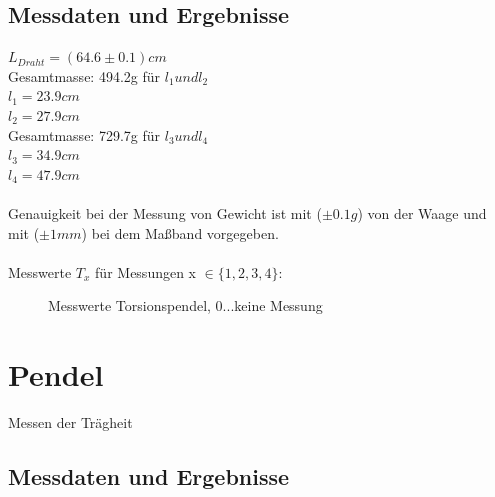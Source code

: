 \documentclass[12pt,a4paper]{article}
\begin{document}
\begin{multicols}{2}
\subsection{Messdaten und Ergebnisse}
$L_{Draht} = (64.6 \pm 0.1)cm$\\
Gesamtmasse: 494.2g für $l_1 und l_2$\\
$l_1 = 23.9cm$\\
$l_2 = 27.9cm$\\
Gesamtmasse: 729.7g für $l_3 und l_4$\\
$l_3 = 34.9cm$\\
$l_4 = 47.9cm$\\
\\
Genauigkeit bei der Messung von Gewicht ist mit ($\pm 0.1g$) von der Waage und mit ($\pm 1mm$) bei dem Maßband vorgegeben.\\
\\
Messwerte $T_x$ für Messungen x $\in\{1,2,3,4\}$:\\

\begin{figure}[H]
	\centering
	\caption{Messwerte Torsionspendel, 0...keine Messung}
	\label{fig:torsion_mw}
\end{figure}

\section{Pendel}

Messen der Trägheit


\subsection{Messdaten und Ergebnisse}


\end{multicols}
\end{document}
